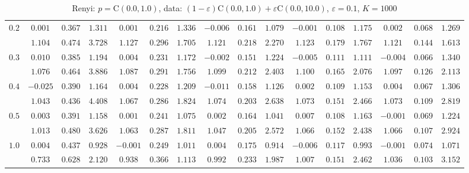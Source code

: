 \documentclass[11pt]{article}
\begin{document}
\begin{table}[ht]
\begin{center}
\begin{tabular}{|c|ccc|ccc|ccc|ccc|ccc|}
\hline 
$0.2$ & $ 0.001 $ & $ 0.367 $ & $ 1.311 $ & $ 0.001 $ & $ 0.216 $ & $ 1.336 $ & $ -0.006 $ & $ 0.161 $ & $ 1.079 $ & $ -0.001 $ & $ 0.108 $ & $ 1.175 $ & $ 0.002 $ & $ 0.068 $ & $ 1.269 $\\ 
 & $ 1.104 $ & $ 0.474 $ & $ 3.728 $ & $ 1.127 $ & $ 0.296 $ & $ 1.705 $ & $ 1.121 $ & $ 0.218 $ & $ 2.270 $ & $ 1.123 $ & $ 0.179 $ & $ 1.767 $ & $ 1.121 $ & $ 0.144 $ & $ 1.613 $\\ 
\hline 
$0.3$ & $ 0.010 $ & $ 0.385 $ & $ 1.194 $ & $ 0.004 $ & $ 0.231 $ & $ 1.172 $ & $ -0.002 $ & $ 0.151 $ & $ 1.224 $ & $ -0.005 $ & $ 0.111 $ & $ 1.111 $ & $ -0.004 $ & $ 0.066 $ & $ 1.340 $\\ 
 & $ 1.076 $ & $ 0.464 $ & $ 3.886 $ & $ 1.087 $ & $ 0.291 $ & $ 1.756 $ & $ 1.099 $ & $ 0.212 $ & $ 2.403 $ & $ 1.100 $ & $ 0.165 $ & $ 2.076 $ & $ 1.097 $ & $ 0.126 $ & $ 2.113 $\\ 
\hline 
$0.4$ & $ -0.025 $ & $ 0.390 $ & $ 1.164 $ & $ 0.004 $ & $ 0.228 $ & $ 1.209 $ & $ -0.011 $ & $ 0.158 $ & $ 1.126 $ & $ 0.002 $ & $ 0.109 $ & $ 1.153 $ & $ 0.004 $ & $ 0.067 $ & $ 1.306 $\\ 
 & $ 1.043 $ & $ 0.436 $ & $ 4.408 $ & $ 1.067 $ & $ 0.286 $ & $ 1.824 $ & $ 1.074 $ & $ 0.203 $ & $ 2.638 $ & $ 1.073 $ & $ 0.151 $ & $ 2.466 $ & $ 1.073 $ & $ 0.109 $ & $ 2.819 $\\ 
\hline 
$0.5$ & $ 0.003 $ & $ 0.391 $ & $ 1.158 $ & $ 0.001 $ & $ 0.241 $ & $ 1.075 $ & $ 0.002 $ & $ 0.164 $ & $ 1.041 $ & $ 0.007 $ & $ 0.108 $ & $ 1.163 $ & $ -0.001 $ & $ 0.069 $ & $ 1.224 $\\ 
 & $ 1.013 $ & $ 0.480 $ & $ 3.626 $ & $ 1.063 $ & $ 0.287 $ & $ 1.811 $ & $ 1.047 $ & $ 0.205 $ & $ 2.572 $ & $ 1.066 $ & $ 0.152 $ & $ 2.438 $ & $ 1.066 $ & $ 0.107 $ & $ 2.924 $\\ 
\hline 
$1.0$ & $ 0.004 $ & $ 0.437 $ & $ 0.928 $ & $ -0.001 $ & $ 0.249 $ & $ 1.011 $ & $ 0.004 $ & $ 0.175 $ & $ 0.914 $ & $ -0.006 $ & $ 0.117 $ & $ 0.993 $ & $ -0.001 $ & $ 0.074 $ & $ 1.071 $\\ 
 & $ 0.733 $ & $ 0.628 $ & $ 2.120 $ & $ 0.938 $ & $ 0.366 $ & $ 1.113 $ & $ 0.992 $ & $ 0.233 $ & $ 1.987 $ & $ 1.007 $ & $ 0.151 $ & $ 2.462 $ & $ 1.036 $ & $ 0.103 $ & $ 3.152 $\\ 
\hline 
\end{tabular}
\caption{Renyi: $p = \mathrm{C}(0.0,1.0)$, data: $(1-\varepsilon)\mathrm{C}(0.0,1.0) + \varepsilon \mathrm{C}(0.0,10.0)$, $\varepsilon =  0.1$, $K = 1000$} 
\end{center}
\end{table}
\end{document}
